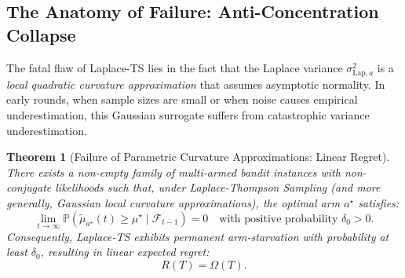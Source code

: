 \documentclass[twoside]{article}
\newtheorem{theorem}{Theorem}
\begin{document}
\subsection{The Anatomy of Failure: Anti-Concentration Collapse}

The fatal flaw of Laplace-TS lies in the fact that the Laplace variance $\sigma_{\text{Lap}, a}^2$ is a \emph{local quadratic curvature approximation} that assumes asymptotic normality. In early rounds, when sample sizes are small or when noise causes empirical underestimation, this Gaussian surrogate suffers from catastrophic variance underestimation.

\begin{theorem}[Failure of Parametric Curvature Approximations: Linear Regret]
\label{thm:laplace_failure}
There exists a non-empty family of multi-armed bandit instances with non-conjugate likelihoods such that, under Laplace-Thompson Sampling (and more generally, Gaussian local curvature approximations), the optimal arm $a^\star$ satisfies:
\begin{equation}
\lim_{t \to \infty} \mathbb{P}\left( \tilde{\mu}_{a^\star}(t) \ge \mu^\star \mid \mathcal{F}_{t-1} \right) = 0 \quad \text{with positive probability } \delta_0 > 0.
\end{equation}
Consequently, Laplace-TS exhibits permanent arm-starvation with probability at least $\delta_0$, resulting in linear expected regret:
\begin{equation}
R(T) = \Omega(T).
\end{equation}
\end{theorem}
\end{document}
